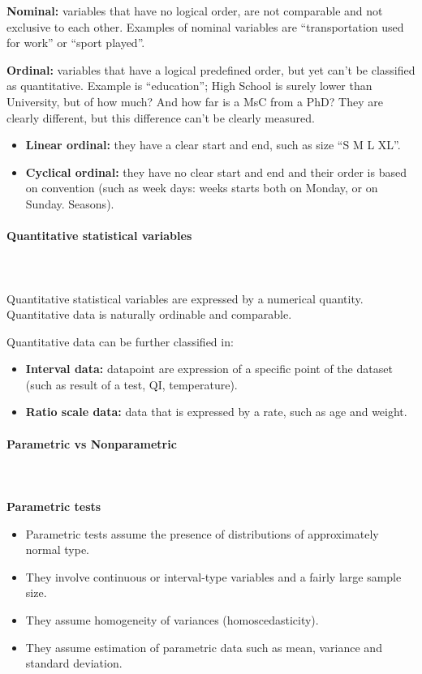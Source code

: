\documentclass{article}
\begin{document}
\textbf{Nominal:} variables that have no logical order, are not comparable and not exclusive to each other. Examples of nominal variables are “transportation used for work” or “sport played”.

\textbf{Ordinal:} variables that have a logical predefined order, but yet can’t be classified as quantitative. 
Example is “education”; High School is surely lower than University, but of how much? 
And how far is a MsC from a PhD? They are clearly different, but this difference can’t be clearly measured. 

    \begin{itemize}
        \item \textbf{Linear ordinal:} they have a clear start and end, such as size “S M L XL”.
        \item \textbf{Cyclical ordinal:} they have no clear start and end and their order is based on convention (such as week days: weeks starts both on Monday, or on Sunday. Seasons).
    \end{itemize}

\paragraph{Quantitative statistical variables}\mbox{} \\
\mbox{} \\

Quantitative statistical variables are expressed by a numerical quantity.
Quantitative data is naturally ordinable and comparable. 

Quantitative data can be further classified in: 

    \begin{itemize}
        \item \textbf{Interval data:} datapoint are expression of a specific point of the dataset (such as result of a test, QI, temperature).
        \item \textbf{Ratio scale data:} data that is expressed by a rate, such as age and weight.
    \end{itemize}

\paragraph{Parametric vs Nonparametric}\mbox{} \\
\mbox{} \\

\textbf{Parametric tests}
\begin{itemize}
    \item Parametric tests assume the presence of distributions of approximately normal type.
    \item They involve continuous or interval-type variables and a fairly large sample size.
    \item They assume homogeneity of variances (homoscedasticity).
    \item They assume estimation of parametric data such as mean, variance and standard deviation.
\end{itemize}
\end{document}
